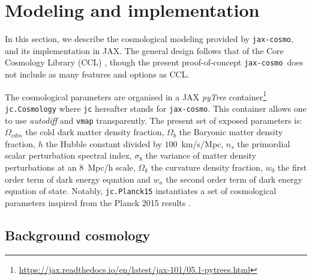 \documentclass[twocolumn,twocolappendix,nofootinbib,iop]{openjournal}
\newcommand{\jaxcosmo}{\texttt{jax-cosmo}}
\begin{document}

\section{Modeling and implementation}
\label{sec-jaxcosmo-design}
In this section, we describe the cosmological modeling provided by \jaxcosmo, and its implementation in JAX. The general design follows that of the Core Cosmology Library (CCL) \citep{2019ApJS..242....2C}, though the present proof-of-concept \jaxcosmo\ does not include as many features and options as CCL.

The cosmological parameters are organised in a JAX \textit{pyTree} container\footnote{\url{https://jax.readthedocs.io/en/latest/jax-101/05.1-pytrees.html}} \texttt{jc.Cosmology} where \texttt{jc} hereafter stands for \jaxcosmo. This container allows one to use \textit{autodiff} and \texttt{vmap} transparently. The present set of exposed parameters is: $\Omega_{cdm}$ the cold dark matter density fraction, $\Omega_b$ the Baryonic matter density fraction, $h$ the Hubble constant divided by $100$~km/s/Mpc, $n_s$ the primordial scalar perturbation spectral index, $\sigma_8$ the variance of matter density perturbations at an $8$~Mpc/h scale, $\Omega_k$ the curvature density fraction, $w_0$ the first order term of dark energy equation and $w_a$ the second order term of dark energy equation of state. Notably, \texttt{jc.Planck15} instantiates a set of cosmological parameters inspired from the Planck 2015 results \citep{2016A&A...594A..13P}. 

\subsection{Background cosmology}
\end{document}
